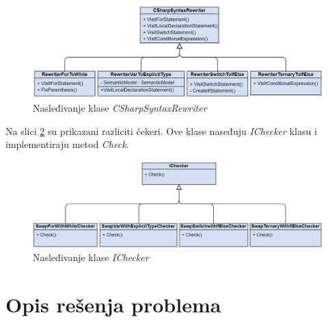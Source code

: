 \documentclass[a4paper]{article}
\begin{document}
{\begin{figure}[h!]
\begin{center}
\includegraphics[scale=0.5]{images/CSharpSyntaxRewriter.png}
\end{center}
\caption{Nasleđivanje klase \textit{CSharpSyntaxRewriter}}
\label{fig:CSharpSyntaxRewriter}
\end{figure}

Na slici \ref{fig:IChecker} su prikazani razliciti čekeri. Ove klase naseđuju \textit{IChecker} klasu i implementiraju metod \textit{Check}.

\begin{figure}[h!]
\begin{center}
\includegraphics[scale=0.5]{images/IChecker.png}
\end{center}
\caption{Nasleđivanje klase \textit{IChecker}}
\label{fig:IChecker}
\end{figure}


\section{Opis rešenja problema}
\label{sec:opis_resenja_problema}

}
\end{document}
